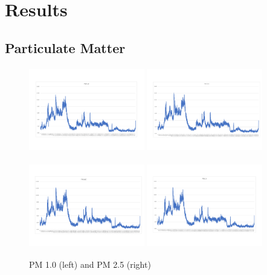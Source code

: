
\chapter{Results}



\vspace{-2em}
\section{Particulate Matter}
\vspace{-2em}
\begin{figure}[!htb]
	\includegraphics[width=0.45\textwidth, height = 10em]{body/fig/PM0.1.pdf}%
	\includegraphics[width=0.45\textwidth, height = 10em]{body/fig/PM2.5.pdf}%
	\caption{PM 1.0 (left) and PM 2.5 (right)}
	\label{ACEM1}
	\includegraphics[width=0.45\textwidth, height = 10em]{body/fig/PM4.pdf}%
	\includegraphics[width=0.45\textwidth, height = 10em]{body/fig/PM10.pdf}%
	\label{ACEM2}
\end{figure}
